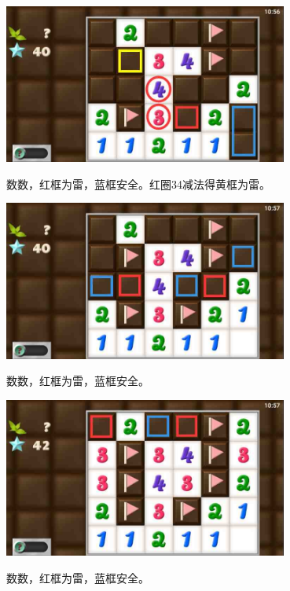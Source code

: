 \begin{center}
    \includegraphics[width=0.7\textwidth]{puzzlelow/212-4.jpg}
\end{center}
数数，红框为雷，蓝框安全。红圈34减法得黄框为雷。
\begin{center}
    \includegraphics[width=0.7\textwidth]{puzzlelow/212-5.jpg}
\end{center}
数数，红框为雷，蓝框安全。
\begin{center}
    \includegraphics[width=0.7\textwidth]{puzzlelow/212-6.jpg}
\end{center}
数数，红框为雷，蓝框安全。

